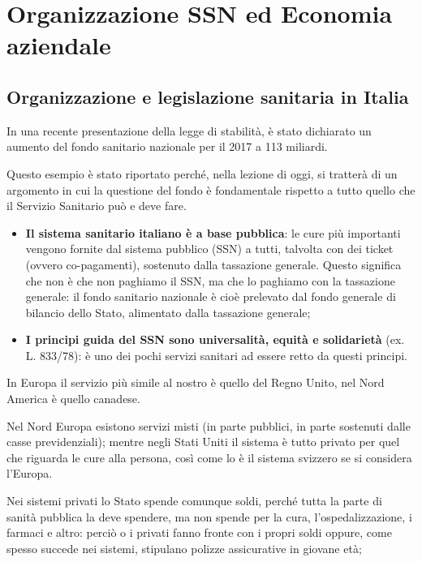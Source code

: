 \section{Organizzazione SSN ed Economia aziendale}

\subsection{Organizzazione e legislazione sanitaria in Italia}

In una recente presentazione della legge di stabilità, è stato dichiarato un aumento del fondo sanitario nazionale per il 2017 a 113 miliardi.

Questo esempio è stato riportato perché, nella lezione di oggi, si tratterà di un argomento in cui la questione del fondo è fondamentale rispetto a tutto quello che il Servizio Sanitario può e deve fare.

\begin{itemize}
\item
  \textbf{Il sistema sanitario italiano è a base pubblica}: le cure più importanti vengono fornite dal sistema pubblico (SSN) a tutti, talvolta con dei ticket (ovvero co-pagamenti), sostenuto dalla tassazione generale.
Questo significa che non è che non paghiamo il SSN, ma che lo paghiamo con la tassazione generale: il fondo sanitario nazionale è cioè prelevato dal fondo generale di bilancio dello Stato, alimentato dalla
tassazione generale;
\item
  \textbf{I principi guida del SSN sono universalità, equità e solidarietà} (ex. L. 833/78): è uno dei pochi servizi sanitari ad essere retto da questi principi.
\end{itemize}

In Europa il servizio più simile al nostro è quello del Regno Unito, nel Nord America è quello canadese.

Nel Nord Europa esistono servizi misti (in parte pubblici, in parte sostenuti dalle casse previdenziali); mentre negli Stati Uniti il sistema è tutto privato per quel che riguarda le cure alla persona, così come lo è il sistema svizzero se si considera l'Europa.

Nei sistemi privati lo Stato spende comunque soldi, perché tutta la parte di sanità pubblica la deve spendere, ma non spende per la cura, l'ospedalizzazione, i farmaci e altro: perciò o i privati fanno fronte con i propri soldi oppure, come spesso succede nei sistemi, stipulano polizze assicurative in giovane età;

